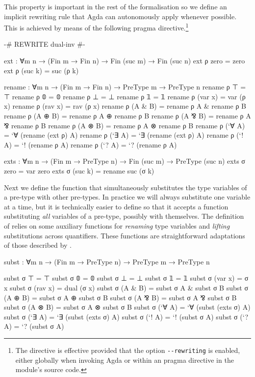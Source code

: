 This property is important in the rest of the formalisation so we define an
implicit rewriting rule that Agda can autonomously apply whenever possible. This
is achieved by means of the following pragma directive.\footnote{The directive
is effective provided that the option \texttt{{-}{-}rewriting} is enabled,
either globally when invoking Agda or within an  pragma
directive in the module's source code.}

\begin{code}
{-# REWRITE dual-inv #-}
\end{code}

\begin{code}[hide]
ext : ∀{m n} → (Fin m → Fin n) → Fin (suc m) → Fin (suc n)
ext ρ zero = zero
ext ρ (suc k) = suc (ρ k)

rename : ∀{m n} → (Fin m → Fin n) → PreType m → PreType n
rename ρ ⊤ = ⊤
rename ρ 𝟘 = 𝟘
rename ρ ⊥ = ⊥
rename ρ 𝟙 = 𝟙
rename ρ (var x) = var (ρ x)
rename ρ (rav x) = rav (ρ x)
rename ρ (A & B) = rename ρ A & rename ρ B
rename ρ (A ⊕ B) = rename ρ A ⊕ rename ρ B
rename ρ (A ⅋ B) = rename ρ A ⅋ rename ρ B
rename ρ (A ⊗ B) = rename ρ A ⊗ rename ρ B
rename ρ (`∀ A) = `∀ (rename (ext ρ) A)
rename ρ (`∃ A) = `∃ (rename (ext ρ) A)
rename ρ (`! A) = `! (rename ρ A)
rename ρ (`? A) = `? (rename ρ A)

exts : ∀{m n} → (Fin m → PreType n) → Fin (suc m) → PreType (suc n)
exts σ zero = var zero
exts σ (suc k) = rename suc (σ k)
\end{code}

Next we define the function  that simultaneously substitutes
the type variables of a pre-type with other pre-types. In practice we will
always substitute one variable at a time, but it is technically easier to define
 so that it accepts a function substituting \emph{all}
variables of a pre-type, possibly with themselves. The definition of
 relies on some auxiliary functions for \emph{renaming} type
variables and \emph{lifting} substitutions across quantifiers. These functions
are straightforward adaptations of those described by \citet{KokkeSiekWadler20}.

\begin{code}
subst : ∀{m n} → (Fin m → PreType n) → PreType m → PreType n
\end{code}
\begin{code}[hide]
subst σ ⊤ = ⊤
subst σ 𝟘 = 𝟘
subst σ ⊥ = ⊥
subst σ 𝟙 = 𝟙
subst σ (var x) = σ x
subst σ (rav x) = dual (σ x)
subst σ (A & B) = subst σ A & subst σ B
subst σ (A ⊕ B) = subst σ A ⊕ subst σ B
subst σ (A ⅋ B) = subst σ A ⅋ subst σ B
subst σ (A ⊗ B) = subst σ A ⊗ subst σ B
subst σ (`∀ A) = `∀ (subst (exts σ) A)
subst σ (`∃ A) = `∃ (subst (exts σ) A)
subst σ (`! A) = `! (subst σ A)
subst σ (`? A) = `? (subst σ A)
\end{code}

